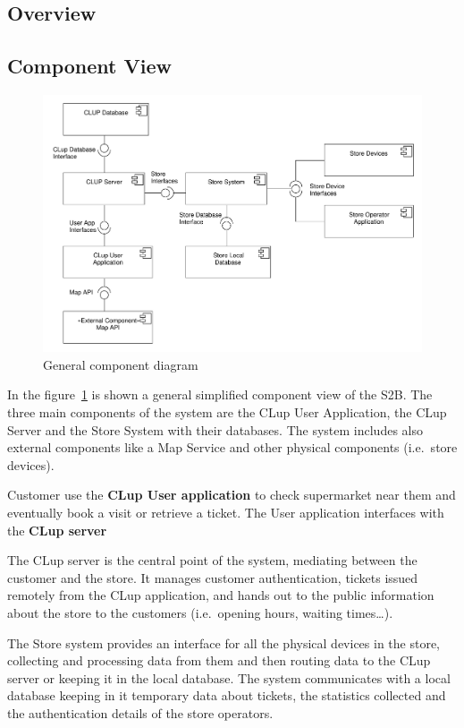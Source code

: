\subsection{Overview}

\subsection{Component View}
\begin{figure}[H]
    \includegraphics[width=\textwidth]{Images/UML_general_component.pdf}
    \caption{\label{fig:UML_comp_general}General component diagram}
\end{figure}
In the figure~\ref{fig:UML_comp_general} is shown a general simplified component view of the S2B.
The three main components of the system are the CLup User Application, the CLup Server and the Store System with their databases. The system includes also external components like a Map Service and other physical components (i.e.~store devices).

Customer use the \textbf{CLup User application} to check supermarket near them and eventually book a visit
or retrieve a ticket. The User application interfaces with the \textbf{CLup server} 

The CLup server is the
central point of the system, mediating between the customer and the store. It manages customer authentication, 
tickets issued remotely from the CLup application, and hands out to the public information about the store to the customers 
(i.e.~opening hours, waiting times\ldots).

The Store system provides an interface for all the physical devices in the store, collecting and processing data from them 
and then routing data to the CLup server or keeping it in the local database. The system communicates with a local database keeping in it temporary data about tickets, the statistics collected and the 
authentication details of the store operators.

